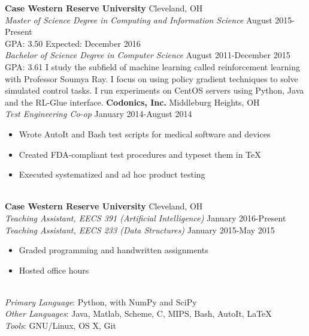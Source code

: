 \documentclass[11pt]{article}
\begin{document}
\begin{adjustwidth}{-2.2cm}{-2.2cm}
    \textbf{Case Western Reserve University} \hfill Cleveland, OH\\
    \emph{Master of Science Degree in Computing and Information Science} \hfill August 2015-Present\\
    GPA: 3.50 \hfill Expected: December 2016
    \\[2ex]
    \emph{Bachelor of Science Degree in Computer Science} \hfill August 2011-December 2015\\
    GPA: 3.61
    \eosec
    I study the subfield of machine learning called reinforcement learning with Professor Soumya Ray. I focus on using policy gradient techniques to solve simulated control tasks. I run experiments on CentOS servers using Python, Java and the RL-Glue interface.
    \eosec
    \textbf{Codonics, Inc.} \hfill Middleburg Heights, OH\\
    \emph{Test Engineering Co-op} \hfill January 2014-August 2014
    \begin{itemize}[nosep]
        \item Wrote AutoIt and Bash test scripts for medical software and devices
        \item Created FDA-compliant test procedures and typeset them in TeX
        \item Executed systematized and ad hoc product testing
    \end{itemize}
    ~\\[0.01\baselineskip]
    \textbf{Case Western Reserve University} \hfill Cleveland, OH\\
    \emph{Teaching Assistant, EECS 391 (Artificial Intelligence)} \hfill January 2016-Present\\
    \emph{Teaching Assistant, EECS 233 (Data Structures)} \hfill January 2015-May 2015
    \begin{itemize}[nosep]
        \item Graded programming and handwritten assignments
        \item Hosted office hours
    \end{itemize}
    ~\\[0.01\baselineskip]
    \emph{Primary Language}: Python, with NumPy and SciPy\\
    \emph{Other Languages}: Java, Matlab, Scheme, C, MIPS, Bash, AutoIt, LaTeX\\
    \emph{Tools}: GNU/Linux, OS X, Git

\end{adjustwidth}
\end{document}

